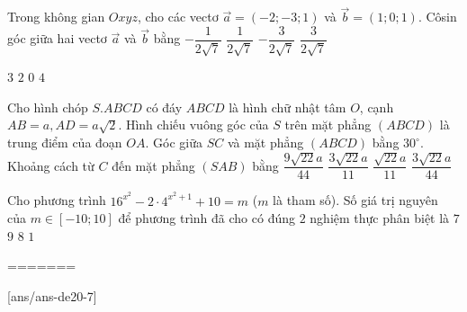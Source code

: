 \begin{ex}%
Trong không gian $O x y z$, cho các vectơ $\vec{a}=(-2;-3; 1)$ và $\vec{b}= (1; 0; 1)$. Côsin góc giữa hai vectơ $\vec{a}$ và $\vec{b}$ bằng
\choice
{\True $-\dfrac{1}{2\sqrt{7}}$}
{$\dfrac{1}{2\sqrt{7}}$}
{$-\dfrac{3}{2\sqrt{7}}$}
{$\dfrac{3}{2\sqrt{7}}$}

\end{ex}
\begin{ex}%
{\vspace{-0.5cm}

}
\choice
{$3$}
{\True $2$}
{$0$}
{$4$}
\end{ex}
\begin{ex}%
Cho hình chóp $S.ABCD$ có đáy $ABCD$ là hình chữ nhật tâm $O$, cạnh $AB=a, AD=a \sqrt{2}$. Hình chiếu vuông góc của $S$ trên mặt phẳng $(ABCD)$ là trung điểm của đoạn $OA$. Góc giữa $SC$ và mặt phẳng $(ABCD)$ bằng $30^{\circ}$. Khoảng cách từ $C$ đến mặt phẳng $(SAB)$ bằng
\choice
{$\dfrac{9\sqrt{22} a}{44}$}
{\True $\dfrac{3\sqrt{22} a}{11}$}
{$\dfrac{\sqrt{22} a}{11}$}
{$\dfrac{3\sqrt{22} a}{44}$}

\end{ex}
\begin{ex}%
Cho phương trình $16^{x^2}-2\cdot 4^{x^2+1}+10=m$ ($m$ là tham số). Số giá trị nguyên của $m \in[-10; 10]$ để phương trình đã cho có đúng $2$ nghiệm thực phân biệt là
\choice
{$7$}
{\True $9$}
{$8$}
{$1$}

\end{ex}

=======

\begin{name}
	{\tenchude}
	{\tendethi}
	{\tentruong}
	{\thoigian}
\end{name}
[ans/ans-de20-7]

